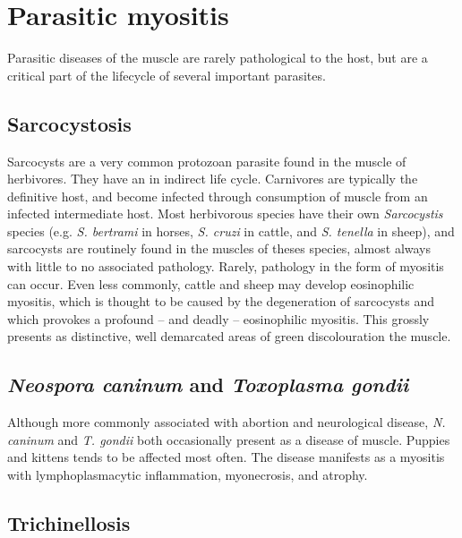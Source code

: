 \documentclass[openany]{book}
\begin{document}
\chapter{Parasitic myositis}\label{parasitic-myositis}

Parasitic diseases of the muscle are rarely pathological to the host,
but are a critical part of the lifecycle of several important parasites.

\hypertarget{sarcocystosis}{\section{Sarcocystosis}\label{sarcocystosis}}

Sarcocysts are a very common protozoan parasite found in the muscle of
herbivores. They have an in indirect life cycle. Carnivores are
typically the definitive host, and become infected through consumption
of muscle from an infected intermediate host. Most herbivorous species
have their own \emph{Sarcocystis} species (e.g. \emph{S. bertrami} in
horses, \emph{S. cruzi} in cattle, and \emph{S. tenella} in sheep), and
sarcocysts are routinely found in the muscles of theses species, almost
always with little to no associated pathology. Rarely, pathology in the
form of myositis can occur. Even less commonly, cattle and sheep may
develop eosinophilic myositis, which is thought to be caused by the
degeneration of sarcocysts and which provokes a profound -- and deadly
-- eosinophilic myositis. This grossly presents as distinctive, well
demarcated areas of green discolouration the muscle.

\section{\texorpdfstring{\emph{Neospora caninum} and \emph{Toxoplasma
gondii}}{Neospora caninum and Toxoplasma gondii}}\label{neospora-caninum-and-toxoplasma-gondii}

Although more commonly associated with abortion and neurological
disease, \emph{N. caninum} and \emph{T. gondii} both occasionally
present as a disease of muscle. Puppies and kittens tends to be affected
most often. The disease manifests as a myositis with lymphoplasmacytic
inflammation, myonecrosis, and atrophy.

\section{Trichinellosis}\label{trichinellosis}
\end{document}
